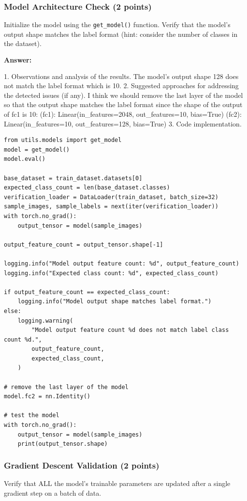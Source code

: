 \documentclass[11pt, oneside]{article}   	%
\begin{document}
\subsubsection*{Model Architecture Check (2 points)}
Initialize the model using the \texttt{get\_model()} function. Verify that the model’s output shape matches the label format (hint: consider the number of classes in the dataset).

\begin{answerbox} \textbf{Answer:} \vspace*{1cm}


1. Observations and analysis of the results.
    The model's output shape 128 does not match the label format which is 10.
2. Suggested approaches for addressing the detected issues (if any).
    I think we should remove the last layer of the model so that the output shape matches the label format since the shape of the output of fc1 is 10:
    (fc1): Linear(in_features=2048, out_features=10, bias=True)
    (fc2): Linear(in_features=10, out_features=128, bias=True)
3. Code implementation.

\begin{verbatim}
from utils.models import get_model
model = get_model()
model.eval()

base_dataset = train_dataset.datasets[0]
expected_class_count = len(base_dataset.classes)
verification_loader = DataLoader(train_dataset, batch_size=32)
sample_images, sample_labels = next(iter(verification_loader))
with torch.no_grad():
    output_tensor = model(sample_images)

output_feature_count = output_tensor.shape[-1]

logging.info("Model output feature count: %d", output_feature_count)
logging.info("Expected class count: %d", expected_class_count)

if output_feature_count == expected_class_count:
    logging.info("Model output shape matches label format.")
else:
    logging.warning(
        "Model output feature count %d does not match label class count %d.",
        output_feature_count,
        expected_class_count,
    )

# remove the last layer of the model
model.fc2 = nn.Identity()

# test the model
with torch.no_grad():
    output_tensor = model(sample_images)
    print(output_tensor.shape)    
\end{verbatim}
\end{answerbox} 

\subsubsection*{Gradient Descent Validation (2 points)}
Verify that ALL the model's trainable parameters are updated after a single gradient step on a batch of data.
\end{document}
